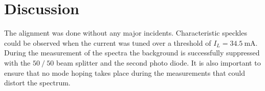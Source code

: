\section{Discussion}
\label{sec:Diskussion}

The alignment was done without any major incidents. 
Characteristic speckles could be observed when the current was tuned over a threshold of $I_L = \SI{34.5}{\milli\ampere}$.\\

During the measurement of the spectra the background is successfully suppressed with the $50\mathbin{/}50$ beam splitter and the second photo diode.
It is also important to ensure that no mode hoping takes place during the measurements that could distort the spectrum.